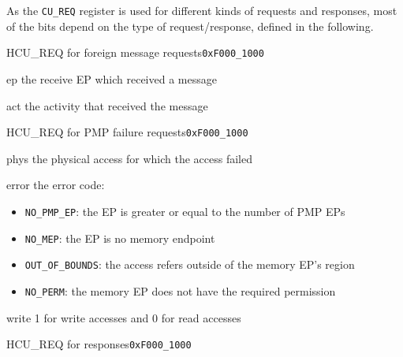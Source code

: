 \noindent As the \texttt{CU\_REQ} register is used for different kinds of requests and responses,
most of the bits depend on the type of request/response, defined in the following.

\begin{register}{H}{CU\_REQ for foreign message requests}{\texttt{0xF000\_1000}}
  \regnewline%
  \begin{regdesc}\begin{reglist}
    \item[ep] the receive EP which received a message
    \item[act] the activity that received the message
  \end{reglist}\end{regdesc}
\end{register}

\begin{register}{H}{CU\_REQ for PMP failure requests}{\texttt{0xF000\_1000}}
  \regnewline%
  \begin{regdesc}\begin{reglist}
    \item[phys] the physical access for which the access failed
    \item[error] the error code:
    \begin{itemize}
       \item \texttt{NO\_PMP\_EP}: the EP is greater or equal to the number of PMP EPs
       \item \texttt{NO\_MEP}: the EP is no memory endpoint
       \item \texttt{OUT\_OF\_BOUNDS}: the access refers outside of the memory EP's region
       \item \texttt{NO\_PERM}: the memory EP does not have the required permission
     \end{itemize}
    \item[write] 1 for write accesses and 0 for read accesses
  \end{reglist}\end{regdesc}
\end{register}

\begin{register}{H}{CU\_REQ for responses}{\texttt{0xF000\_1000}}
  \regnewline%
\end{register}
\extend{}

